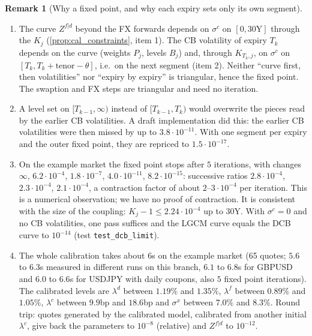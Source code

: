 \documentclass[11pt,english]{amsart}
\theoremstyle{definition}
\newtheorem{rema}{Remark}
\begin{document}
\begin{rema}[Why a fixed point, and why each expiry sets only its own segment]\label{rema:cal_fixed_point}
\begin{enumerate}
\item The curve $Z^{f|d}$ beyond the FX forwards depends on $\sigma^c$ on $[0,30\mathrm{Y}]$ through the $K_j$ (\autoref{prop:cal_constraints}, item 1). The CB volatility of expiry $T_k$ depends on the curve (weights $P_j$, levels $B_j$) and, through $K_{T_k,j}$, on $\sigma^c$ on $[T_k,T_k+\mathrm{tenor}-\theta]$, i.e.\ on the next segment (item 2). Neither ``curve first, then volatilities'' nor ``expiry by expiry'' is triangular, hence the fixed point. The swaption and FX steps are triangular and need no iteration.
\item A level set on $[T_{k-1},\infty)$ instead of $[T_{k-1},T_k)$ would overwrite the pieces read by the earlier CB volatilities. A draft implementation did this: the earlier CB volatilities were then missed by up to $3.8\cdot10^{-11}$. With one segment per expiry and the outer fixed point, they are repriced to $1.5\cdot10^{-17}$.
\item On the example market the fixed point stops after $5$ iterations, with changes $\infty$, $6.2\cdot10^{-4}$, $1.8\cdot10^{-7}$, $4.0\cdot10^{-11}$, $8.2\cdot10^{-15}$: successive ratios $2.8\cdot10^{-4}$, $2.3\cdot10^{-4}$, $2.1\cdot10^{-4}$, a contraction factor of about $2$--$3\cdot10^{-4}$ per iteration. This is a numerical observation; we have no proof of contraction. It is consistent with the size of the coupling: $K_j - 1\le 2.24\cdot10^{-4}$ up to $30$Y. With $\sigma^c = 0$ and no CB volatilities, one pass suffices and the LGCM curve equals the DCB curve to $10^{-14}$ (test \texttt{test\_dcb\_limit}).
\item The whole calibration takes about $6$s on the example market (65 quotes; $5.6$ to $6.3$s measured in different runs on this branch, $6.1$ to $6.8$s for GBPUSD and $6.0$ to $6.6$s for USDJPY with daily coupons, also $5$ fixed point iterations). The calibrated levels are $\lambda^d$ between $1.19\%$ and $1.35\%$, $\lambda^f$ between $0.89\%$ and $1.05\%$, $\lambda^c$ between $9.9$bp and $18.6$bp and $\sigma^x$ between $7.0\%$ and $8.3\%$. Round trip: quotes generated by the calibrated model, calibrated from another initial $\lambda^c$, give back the parameters to $10^{-8}$ (relative) and $Z^{f|d}$ to $10^{-12}$.
\end{enumerate}
\end{rema}
\end{document}
